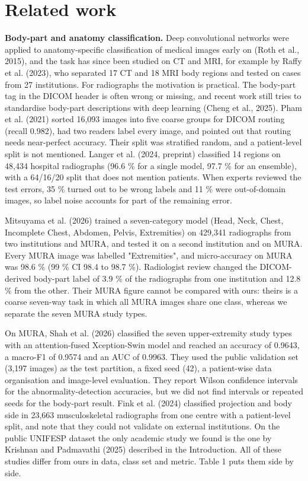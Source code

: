 \section{Related work}
\textbf{Body-part and anatomy classification.} Deep convolutional networks were applied to anatomy-specific classification of medical images early on (Roth et al., 2015), and the task has since been studied on CT and MRI, for example by Raffy et al. (2023), who separated 17 CT and 18 MRI body regions and tested on cases from 27 institutions. For radiographs the motivation is practical. The body-part tag in the DICOM header is often wrong or missing, and recent work still tries to standardise body-part descriptions with deep learning (Cheng et al., 2025). Pham et al. (2021) sorted 16,093 images into five coarse groups for DICOM routing (recall 0.982), had two readers label every image, and pointed out that routing needs near-perfect accuracy. Their split was stratified random, and a patient-level split is not mentioned. Langer et al. (2024, preprint) classified 14 regions on 48,434 hospital radiographs (96.6 \% for a single model, 97.7 \% for an ensemble), with a 64/16/20 split that does not mention patients. When experts reviewed the test errors, 35 \% turned out to be wrong labels and 11 \% were out-of-domain images, so label noise accounts for part of the remaining error.

Mitsuyama et al. (2026) trained a seven-category model (Head, Neck, Chest, Incomplete Chest, Abdomen, Pelvis, Extremities) on 429,341 radiographs from two institutions and MURA, and tested it on a second institution and on MURA. Every MURA image was labelled "Extremities", and micro-accuracy on MURA was 98.6 \% (99 \% CI 98.4 to 98.7 \%). Radiologist review changed the DICOM-derived body-part label of 3.9 \% of the radiographs from one institution and 12.8 \% from the other. Their MURA figure cannot be compared with ours: theirs is a coarse seven-way task in which all MURA images share one class, whereas we separate the seven MURA study types.

On MURA, Shah et al. (2026) classified the seven upper-extremity study types with an attention-fused Xception-Swin model and reached an accuracy of 0.9643, a macro-F1 of 0.9574 and an AUC of 0.9963. They used the public validation set (3,197 images) as the test partition, a fixed seed (42), a patient-wise data organisation and image-level evaluation. They report Wilson confidence intervals for the abnormality-detection accuracies, but we did not find intervals or repeated seeds for the body-part result. Fink et al. (2024) classified projection and body side in 23,663 musculoskeletal radiographs from one centre with a patient-level split, and note that they could not validate on external institutions. On the public UNIFESP dataset the only academic study we found is the one by Krishnan and Padmavathi (2025) described in the Introduction. All of these studies differ from ours in data, class set and metric. Table 1 puts them side by side.

